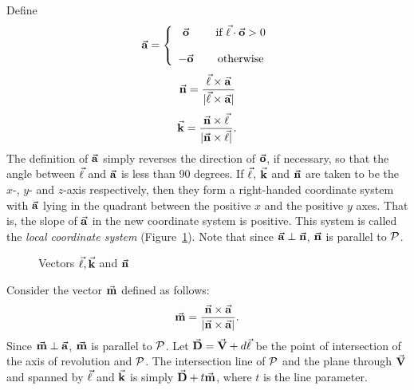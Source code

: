      Define
\begin{equation}
\label{eqn:vector-a}
      \vec{\bf a} = \left\{ \begin{array}{ccc}
                    \vec{\bf o} & & \mbox{if $\vec{\bf \ell}\cdot\vec{\bf o}>0$}\\
                              & & \\
                   -\vec{\bf o} & & \mbox{otherwise}
                    \end{array} \right.
\end{equation}
\begin{equation}
\label{eqn:vector-n}
\vec{\bf n}=\frac{\vec{\bf \ell}\times\vec{\bf a}}{|\vec{\bf \ell}\times\vec{\bf a}|}
\end{equation}
\begin{equation}
\label{eqn:vector-k}
\vec{\bf k}=\frac{\vec{\bf n}\times\vec{\bf \ell}}{|\vec{\bf n}\times\vec{\bf \ell}|}.
\end{equation}
The definition of $\vec{\bf a}$ simply reverses the direction of $\vec{\bf o}$,
if necessary, so that the angle between $\vec{\bf \ell}$ and $\vec{\bf a}$ is less
than 90 degrees.
If $\vec{\bf \ell}$, $\vec{\bf k}$ and $\vec{\bf n}$ are taken to be the $x$-, $y$-
and $z$-axis respectively, then they form a right-handed coordinate system
with $\vec{\bf a}$ lying in the quadrant between the positive $x$ and the
positive $y$ axes.  That is, the slope of $\vec{\bf a}$ in the new coordinate
system is positive.  This system is called the {\em local coordinate system}
(Figure~\ref{fig:vectors-a-n-k}).
Note that since $\vec{\bf a}\perp\vec{\bf n}$, $\vec{\bf n}$ is
parallel to ${\cal P}$.
\begin{figure}
\vspace{5.5cm}
\caption{Vectors $\vec{\bf \ell}, \vec{\bf k}$ and $\vec{\bf n}$}
\label{fig:vectors-a-n-k}
\end{figure}

     Consider the vector $\vec{\bf m}$ defined as follows:
\begin{equation}
\label{eqn:vector-m}
\vec{\bf m}=\frac{\vec{\bf n}\times\vec{\bf a}}{|\vec{\bf n}\times\vec{\bf a}|}.
\end{equation}
Since $\vec{\bf m}\perp\vec{\bf a}$, $\vec{\bf m}$ is parallel to ${\cal P}$.
Let $\vec{\bf D}=\vec{\bf V}+d\vec{\bf \ell}$ be the point of
intersection of the axis of revolution and
${\cal P}$.  The intersection line of ${\cal P}$ and the plane through
$\vec{\bf V}$ and spanned by $\vec{\bf \ell}$ and $\vec{\bf k}$ is simply
$\vec{\bf D}+t\vec{\bf m}$, where $t$ is the line parameter.

